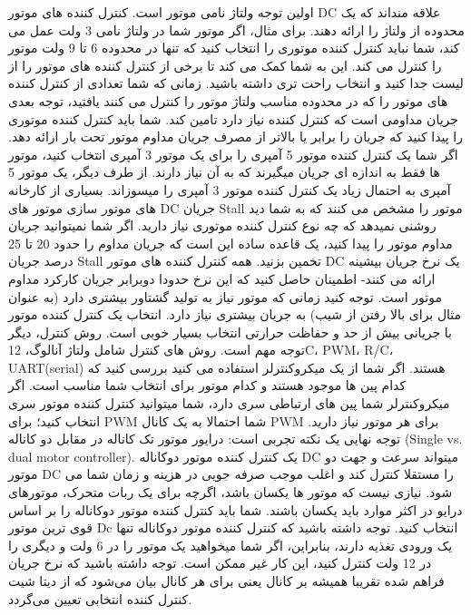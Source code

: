 اولین توجه ولتاژ نامی موتور است. کنترل کننده های موتور DC علاقه منداند که یک محدوده از ولتاژ را ارائه دهند. برای مثال، اگر موتور شما در ولتاژ نامی 3 ولت عمل می کند، شما نباید کنترل کننده موتوری را انتخاب کنید که تنها در محدوده 6 تا 9 ولت موتور را کنترل می کند. این به شما کمک می کند تا برخی از کنترل کننده های موتور را از لیست جدا کنید و انتخاب راحت تری داشته باشید.
زمانی که شما تعدادی از کنترل کننده های موتور را که در محدوده مناسب ولتاژ موتور را کنترل می کنند یافتید، توجه بعدی جریان مداومی است که کنترل کننده نیاز دارد تامین کند. شما باید کنترل کننده موتوری را پیدا کنید که جریان را برابر یا بالاتر از مصرف جریان مداوم موتور تحت بار ارائه دهد. اگر شما یک کنترل کننده موتور 5 آمپری را برای یک موتور 3 آمپری انتخاب کنید، موتور ها فقط به اندازه ای جریان میگیرند که به آن نیاز دارند. از طرف دیگر، یک موتور 5 آمپری به احتمال زیاد یک کنترل کننده موتور 3 آمپری را میسوزاند. بسیاری از کارخانه های موتور سازی موتور های DC جریان Stall موتور را مشخص می کنند که به شما دید روشنی نمیدهد که چه نوع کنترل کننده موتوری نیاز دارید. اگر شما نمیتوانید جریان مداوم موتور را پیدا کنید، یک قاعده ساده این است که جریان مداوم را حدود 20 تا 25 درصد جریان Stall تخمین بزنید. همه کنترل کننده های موتور DC یک نرخ جریان بیشینه ارائه می کنند- اطمینان حاصل کنید که این نرخ حدودا دوبرابر جریان کارکرد مداوم موتور است. توجه کنید زمانی که موتور نیاز به تولید گشتاور بیشتری دارد (به عنوان مثال برای بالا رفتن از شیب) به جریان بیشتری نیاز دارد. انتخاب یک کنترل کننده موتور با جریانی بیش از حد و حفاظت حرارتی انتخاب بسیار خوبی است.
روش کنترل، دیگر توجه مهم است. روش های کنترل شامل ولتاژ آنالوگ، 12C، PWM، R/C، UART(serial) هستند. اگر شما از یک میکروکنترلر استفاده می کنید بررسی کنید که کدام پین ها موجود هستند و کدام موتور برای انتخاب شما مناسب است. اگر میکروکنترلر شما پین های ارتباطی سری دارد، شما میتوانید کنترل کننده موتور سری انتخاب کنید؛ برای PWM شما احتمالا به یک کانال PWM برای هر موتور نیاز دارید.
توجه نهایی یک نکته تجربی است: درایور موتور تک کاناله در مقابل دو کاناله (Single vs. dual motor controller). یک کنترل کننده موتور دوکاناله DC میتواند سرعت و جهت دو موتور DC را مستقلا کنترل کند و اغلب موجب صرفه جویی در هزینه و زمان شما می شود. نیازی نیست که موتور ها یکسان باشد، اگرچه برای یک ربات متحرک، موتورهای درایو در اکثر موارد باید یکسان باشند. شما باید کنترل کننده موتور دوکاناله را بر اساس قوی ترین موتور Dc انتخاب کنید. توجه داشته باشید که کنترل کننده موتور دوکاناله تنها یک ورودی تغذیه دارند، بنابراین، اگر شما میخواهید یک موتور را در 6 ولت و دیگری را در 12 ولت کنترل کنید، این کار غیر ممکن است. توجه داشته باشید که نرخ جریان فراهم شده تقریبا همیشه بر کانال یعنی برای هر کانال بیان می‌شود که از دیتا شیت کنترل کننده انتخابی تعیین می‌گردد.


